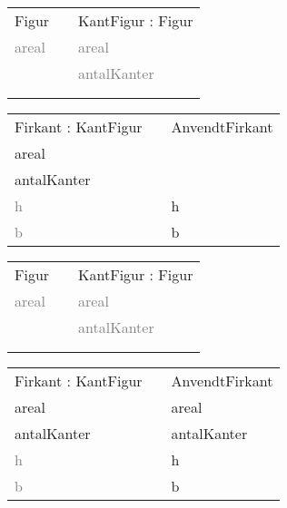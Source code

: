 \begin{frame}[fragile] 
\begin{table}[h]
\begin{tabular}{|l|l|l|}
 \cline{1-1} \cline{3-3} 
Figur          &  & KantFigur : Figur    \\ \cline{1-1} \cline{3-3} 
\textcolor{gray}{areal} &  & \textcolor{gray}{areal}       \\
               &  & \textcolor{gray}{antalKanter} \\
               &  &                      \\
               &  &                      \\ \cline{1-1} \cline{3-3} 
\end{tabular}
\end{table}
\begin{table}[h]
\begin{tabular}{|l|l|l|}
 \cline{1-1} \cline{3-3} 
Firkant : KantFigur &  & AnvendtFirkant       \\ \cline{1-1} \cline{3-3} 
areal               &  &                      \\
antalKanter         &  &                      \\
\textcolor{gray}{h}          &  & h                    \\
\textcolor{gray}{b}          &  & b                    \\ \cline{1-1} \cline{3-3} 
\end{tabular}
\end{table}
\end{frame}

\begin{frame}[fragile] 
\begin{table}[h]
\begin{tabular}{|l|l|l|}
 \cline{1-1} \cline{3-3} 
Figur          &  & KantFigur : Figur    \\ \cline{1-1} \cline{3-3} 
\textcolor{gray}{areal} &  & \textcolor{gray}{areal}       \\
               &  & \textcolor{gray}{antalKanter} \\
               &  &                      \\
               &  &                      \\ \cline{1-1} \cline{3-3} 
\end{tabular}
\end{table}
\begin{table}[h]
\begin{tabular}{|l|l|l|}
 \cline{1-1} \cline{3-3} 
Firkant : KantFigur &  & AnvendtFirkant       \\ \cline{1-1} \cline{3-3} 
areal               &  & areal                \\
antalKanter         &  & antalKanter          \\
\textcolor{gray}{h}          &  & h                    \\
\textcolor{gray}{b}          &  & b                    \\ \cline{1-1} \cline{3-3} 
\end{tabular}
\end{table}
\end{frame}

